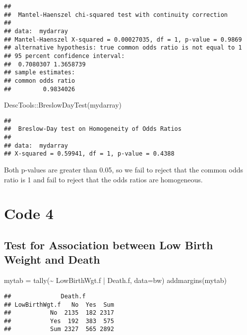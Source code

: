\documentclass[
]{article}
\newenvironment{Shaded}{\begin{snugshade}}{\end{snugshade}}
\newcommand{\AttributeTok}[1]{\textcolor[rgb]{0.77,0.63,0.00}{#1}}
\newcommand{\FunctionTok}[1]{\textcolor[rgb]{0.00,0.00,0.00}{#1}}
\newcommand{\NormalTok}[1]{#1}
\newcommand{\OtherTok}[1]{\textcolor[rgb]{0.56,0.35,0.01}{#1}}
\newcommand{\SpecialCharTok}[1]{\textcolor[rgb]{0.00,0.00,0.00}{#1}}
\begin{document}
\begin{verbatim}
## 
##  Mantel-Haenszel chi-squared test with continuity correction
## 
## data:  mydarray
## Mantel-Haenszel X-squared = 0.00027035, df = 1, p-value = 0.9869
## alternative hypothesis: true common odds ratio is not equal to 1
## 95 percent confidence interval:
##  0.7080307 1.3658739
## sample estimates:
## common odds ratio 
##         0.9834026
\end{verbatim}

\begin{Shaded}
\begin{Highlighting}[]
\NormalTok{DescTools}\SpecialCharTok{::}\FunctionTok{BreslowDayTest}\NormalTok{(mydarray)}
\end{Highlighting}
\end{Shaded}

\begin{verbatim}
## 
##  Breslow-Day test on Homogeneity of Odds Ratios
## 
## data:  mydarray
## X-squared = 0.59941, df = 1, p-value = 0.4388
\end{verbatim}

Both p-values are greater than 0.05, so we fail to reject that the
common odds ratio is 1 and fail to reject that the odds ratios are
homogeneous.

\hypertarget{code-4}{%
\section{Code 4}\label{code-4}}

\hypertarget{test-for-association-between-low-birth-weight-and-death}{%
\subsection{Test for Association between Low Birth Weight and
Death}\label{test-for-association-between-low-birth-weight-and-death}}

\begin{Shaded}
\begin{Highlighting}[]
\NormalTok{mytab }\OtherTok{=} \FunctionTok{tally}\NormalTok{(}\SpecialCharTok{\textasciitilde{}}\NormalTok{ LowBirthWgt.f }\SpecialCharTok{|}\NormalTok{ Death.f, }\AttributeTok{data=}\NormalTok{bw)}
\FunctionTok{addmargins}\NormalTok{(mytab)}
\end{Highlighting}
\end{Shaded}

\begin{verbatim}
##              Death.f
## LowBirthWgt.f   No  Yes  Sum
##           No  2135  182 2317
##           Yes  192  383  575
##           Sum 2327  565 2892
\end{verbatim}
\end{document}
